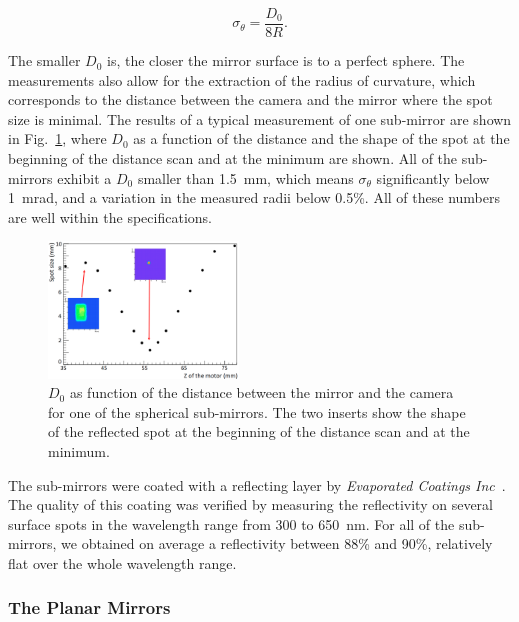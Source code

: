 \documentclass[5p,times,twocolumn]{elsarticle}
\begin{document}
\begin{equation}
  \sigma_{\theta} = \frac{D_0}{8 R}.
\end{equation}

The smaller $D_0$ is, the closer the mirror surface is to a perfect sphere. The measurements also allow for the
extraction of the radius of curvature, which corresponds to the distance between the camera and the mirror where
the spot size is minimal. The results of a typical measurement of one sub-mirror are shown in Fig.~\ref{Fig:SpotCMA},
where $D_0$ as a function of the distance and the shape of the spot at the beginning of the distance scan and
at the minimum are shown. All of the sub-mirrors exhibit a $D_0$ smaller than 1.5~mm, which means $\sigma_{\theta}$
significantly below 1~mrad, and a variation in the measured radii below 0.5\%. All of these numbers are well within the
specifications.

\begin{figure}
\begin{center}
\includegraphics[width=0.45\textwidth]{SpotCMA.png}
\caption{$D_0$ as function of the distance between the mirror and the camera for one of the spherical sub-mirrors.
  The two inserts show the shape of the reflected spot at the beginning of the distance scan and at the minimum.}
\label{Fig:SpotCMA}
\end{center}
\end{figure}

The sub-mirrors were coated with a reflecting layer by {\it Evaporated Coatings Inc}~\cite{REF:ECI}. The quality of
this coating was verified by measuring the reflectivity on several surface spots in the wavelength range from 300 to
650~nm. For all of the sub-mirrors, we obtained on average a reflectivity between 88\% and 90\%, relatively flat over
the whole wavelength range.

\subsubsection{The Planar Mirrors}
\end{document}
